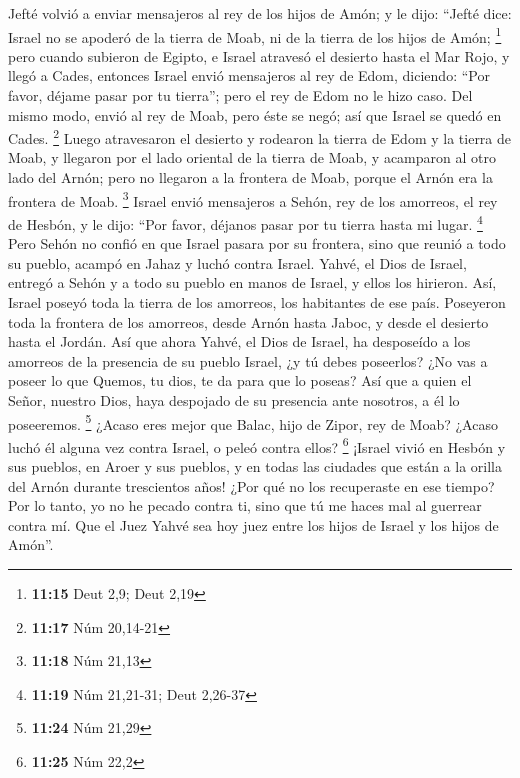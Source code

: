 \begin{paracol}{2}
 Jefté volvió a enviar mensajeros al rey de los hijos de
Amón;  y le dijo: ``Jefté dice: Israel no se apoderó de
la tierra de Moab, ni de la tierra de los hijos de Amón; \footnote{\textbf{11:15}
  Deut 2,9; Deut 2,19}  pero cuando subieron de Egipto, e
Israel atravesó el desierto hasta el Mar Rojo, y llegó a Cades,
 entonces Israel envió mensajeros al rey de Edom,
diciendo: ``Por favor, déjame pasar por tu tierra''; pero el rey de Edom
no le hizo caso. Del mismo modo, envió al rey de Moab, pero éste se
negó; así que Israel se quedó en Cades. \footnote{\textbf{11:17} Núm
  20,14-21}  Luego atravesaron el desierto y rodearon la
tierra de Edom y la tierra de Moab, y llegaron por el lado oriental de
la tierra de Moab, y acamparon al otro lado del Arnón; pero no llegaron
a la frontera de Moab, porque el Arnón era la frontera de Moab.
\footnote{\textbf{11:18} Núm 21,13}  Israel envió
mensajeros a Sehón, rey de los amorreos, el rey de Hesbón, y le dijo:
``Por favor, déjanos pasar por tu tierra hasta mi lugar. \footnote{\textbf{11:19}
  Núm 21,21-31; Deut 2,26-37}  Pero Sehón no confió en
que Israel pasara por su frontera, sino que reunió a todo su pueblo,
acampó en Jahaz y luchó contra Israel.  Yahvé, el Dios de
Israel, entregó a Sehón y a todo su pueblo en manos de Israel, y ellos
los hirieron. Así, Israel poseyó toda la tierra de los amorreos, los
habitantes de ese país.  Poseyeron toda la frontera de
los amorreos, desde Arnón hasta Jaboc, y desde el desierto hasta el
Jordán.  Así que ahora Yahvé, el Dios de Israel, ha
desposeído a los amorreos de la presencia de su pueblo Israel, ¿y tú
debes poseerlos?  ¿No vas a poseer lo que Quemos, tu
dios, te da para que lo poseas? Así que a quien el Señor, nuestro Dios,
haya despojado de su presencia ante nosotros, a él lo poseeremos.
\footnote{\textbf{11:24} Núm 21,29}  ¿Acaso eres mejor
que Balac, hijo de Zipor, rey de Moab? ¿Acaso luchó él alguna vez contra
Israel, o peleó contra ellos? \footnote{\textbf{11:25} Núm 22,2}
 ¡Israel vivió en Hesbón y sus pueblos, en Aroer y sus
pueblos, y en todas las ciudades que están a la orilla del Arnón durante
trescientos años! ¿Por qué no los recuperaste en ese tiempo?
 Por lo tanto, yo no he pecado contra ti, sino que tú me
haces mal al guerrear contra mí. Que el Juez Yahvé sea hoy juez entre
los hijos de Israel y los hijos de Amón''.


\end{paracol}

